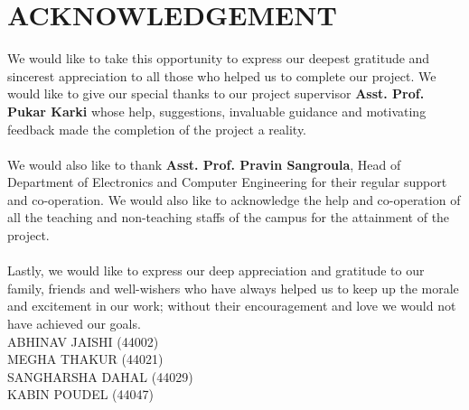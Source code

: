 \newpage

\section*{ACKNOWLEDGEMENT}

We would like to take this opportunity to express our deepest gratitude and sincerest appreciation to all those who helped us to complete our project. We would like to give our special thanks to our project supervisor { \bf Asst. Prof. Pukar Karki} whose help, suggestions, invaluable guidance and motivating feedback made the completion of the project a reality.\\
\\
We would also like to thank {\bf Asst. Prof. Pravin Sangroula}, Head of Department of Electronics and Computer Engineering for their regular support and co-operation. We would also like to acknowledge the help and co-operation of all the teaching and non-teaching staffs of the campus for the attainment of the project.\\
\\
Lastly, we would like to express our deep appreciation and gratitude to our family, friends and well-wishers who have always helped us to keep up the morale and excitement in our work; without their encouragement and love we would not have achieved
our goals.
\vspace{1cm}\\
ABHINAV JAISHI (44002)\\
MEGHA THAKUR (44021)\\
SANGHARSHA DAHAL (44029)\\
KABIN POUDEL (44047)\\
\\
